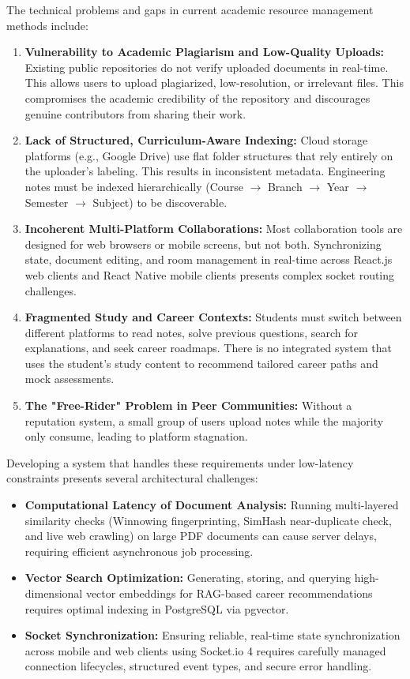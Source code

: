 \documentclass[12,Times new Roman,a4paper]{report}
\begin{document}
The technical problems and gaps in current academic resource management methods include:
\begin{enumerate}
    \item \textbf{Vulnerability to Academic Plagiarism and Low-Quality Uploads:} Existing public repositories do not verify uploaded documents in real-time. This allows users to upload plagiarized, low-resolution, or irrelevant files. This compromises the academic credibility of the repository and discourages genuine contributors from sharing their work.
    \item \textbf{Lack of Structured, Curriculum-Aware Indexing:} Cloud storage platforms (e.g., Google Drive) use flat folder structures that rely entirely on the uploader's labeling. This results in inconsistent metadata. Engineering notes must be indexed hierarchically (Course $\rightarrow$ Branch $\rightarrow$ Year $\rightarrow$ Semester $\rightarrow$ Subject) to be discoverable.
    \item \textbf{Incoherent Multi-Platform Collaborations:} Most collaboration tools are designed for web browsers or mobile screens, but not both. Synchronizing state, document editing, and room management in real-time across React.js web clients and React Native mobile clients presents complex socket routing challenges.
    \item \textbf{Fragmented Study and Career Contexts:} Students must switch between different platforms to read notes, solve previous questions, search for explanations, and seek career roadmaps. There is no integrated system that uses the student's study content to recommend tailored career paths and mock assessments.
    \item \textbf{The "Free-Rider" Problem in Peer Communities:} Without a reputation system, a small group of users upload notes while the majority only consume, leading to platform stagnation.
\end{enumerate}

Developing a system that handles these requirements under low-latency constraints presents several architectural challenges:
\begin{itemize}
    \item \textbf{Computational Latency of Document Analysis:} Running multi-layered similarity checks (Winnowing fingerprinting, SimHash near-duplicate check, and live web crawling) on large PDF documents can cause server delays, requiring efficient asynchronous job processing.
    \item \textbf{Vector Search Optimization:} Generating, storing, and querying high-dimensional vector embeddings for RAG-based career recommendations requires optimal indexing in PostgreSQL via pgvector.
    \item \textbf{Socket Synchronization:} Ensuring reliable, real-time state synchronization across mobile and web clients using Socket.io 4 requires carefully managed connection lifecycles, structured event types, and secure error handling.
\end{itemize}
\end{document}
